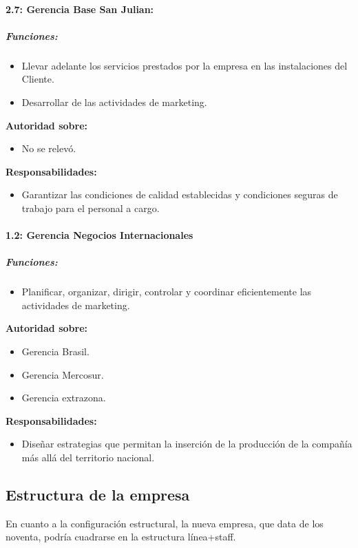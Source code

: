 \documentclass[a4paper,10pt]{article}
\begin{document}
			\paragraph{2.7: Gerencia Base San Julian:}
		\subparagraph{Funciones:}
			\begin{itemize}
	 			\item Llevar adelante los servicios prestados por la empresa en las instalaciones del Cliente.
	 			\item Desarrollar de las actividades de marketing.
	 		\end{itemize}
			

		\textbf{Autoridad sobre:} 
		\begin{itemize}
			\item No se relevó.
		\end{itemize}

		\textbf{Responsabilidades:}
		\begin{itemize}
			\item Garantizar las condiciones de calidad establecidas y condiciones seguras de trabajo para el personal a cargo.
		\end{itemize}

		\paragraph{1.2: Gerencia Negocios Internacionales}
	\subparagraph{Funciones:}
			\begin{itemize}
	 			\item Planificar, organizar, dirigir, controlar y coordinar eficientemente las actividades de marketing.
	 		\end{itemize}
			

		\textbf{Autoridad sobre:} 
		\begin{itemize}
			\item Gerencia Brasil.
			\item Gerencia Mercosur.
			\item Gerencia extrazona.
		\end{itemize}

		\textbf{Responsabilidades:}
		\begin{itemize}
			\item Diseñar estrategias que permitan la inserción de la producción de la compañía más allá del territorio nacional.
		\end{itemize}

			


\subsection{Estructura de la empresa}
En cuanto a la configuración estructural, la nueva empresa, que data de los noventa, podría cuadrarse en la estructura línea+staff.
\end{document}
